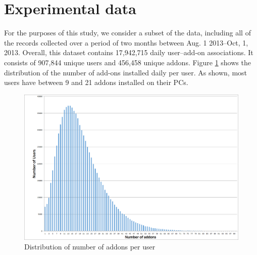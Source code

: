\documentclass[11pt,oneside]{book}
\let\Oldsection\section
\renewcommand{\section}{\FloatBarrier\Oldsection}
\begin{document}
\section{Experimental data}

For the purposes of this study, we consider a subset of the data, including all of the records collected over a  period of two months between Aug. 1 2013--Oct, 1, 2013. Overall, this dataset contains 17,942,715 daily user--add-on associations. It consists of 907,844 unique users and 456,458 unique addons. Figure \ref{fig:user_addons_histogram} shows the distribution of the number of add-ons installed daily per user. As shown,  most users have between 9 and 21 addons installed on their PCs.

\begin{figure}[h]
\centering
\includegraphics[width=\linewidth]{figures/user_addons_histogram.png}
\caption{Distribution of number of addons per user}
\label{fig:user_addons_histogram}
\end{figure}
\end{document}
